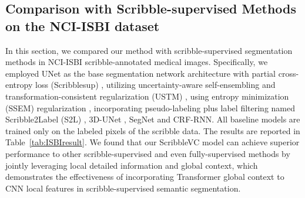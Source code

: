\documentclass[sigconf,natbib=false]{acmart}
\begin{document}
\subsection{Comparison with Scribble-supervised Methods on the NCI-ISBI dataset}
In this section, we compared our method with scribble-supervised segmentation methods in NCI-ISBI scribble-annotated medical images. Specifically, we employed UNet as the base segmentation network architecture with
partial cross-entropy loss (Scribblesup) \cite{lin2016scribblesup}, 
utilizing uncertainty-aware self-ensembling and transformation-consistent regularization (USTM) \cite{liu2022weakly}, 
using entropy minimization (SSEM) regularization \cite{EM}, incorporating pseudo-labeling plus label filtering named Scribble2Label (S2L) \cite{S2L}, 3D-UNet \cite{cciccek20163d}, SegNet \cite{badrinarayanan2017segnet} and CRF-RNN\cite{monteiro2018conditional}.
All baseline models are trained only on the labeled pixels of the scribble data. 
The results are reported in Table~\ref{tab:ISBIresult}. We found that 
our ScribbleVC model can achieve superior performance to other scribble-supervised and even fully-supervised methods by jointly leveraging local detailed information and global context, which demonstrates the effectiveness of incorporating Transformer global context to CNN local features in scribble-supervised semantic segmentation.
\vspace{-2mm}
\begin{table}[!ht]\tiny
\setlength{\abovecaptionskip}{0mm}
    \centering
    \caption{Comparison with scribble-supervised methods on the Prostate (NCI-ISBI)  dataset.} \label{tab:ISBIresult}
    \vspace{-4mm}
\end{table}
\vspace{-2mm}
\end{document}
